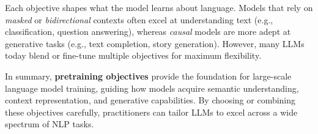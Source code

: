 \noindent
Each objective shapes what the model learns about language. Models that rely on \emph{masked} or \emph{bidirectional} contexts often excel at understanding text (e.g., classification, question answering), whereas \emph{causal} models are more adept at generative tasks (e.g., text completion, story generation). However, many LLMs today blend or fine-tune multiple objectives for maximum flexibility.

\noindent
In summary, \textbf{pretraining objectives} provide the foundation for large-scale language model training, guiding how models acquire semantic understanding, context representation, and generative capabilities. By choosing or combining these objectives carefully, practitioners can tailor LLMs to excel across a wide spectrum of NLP tasks. 
